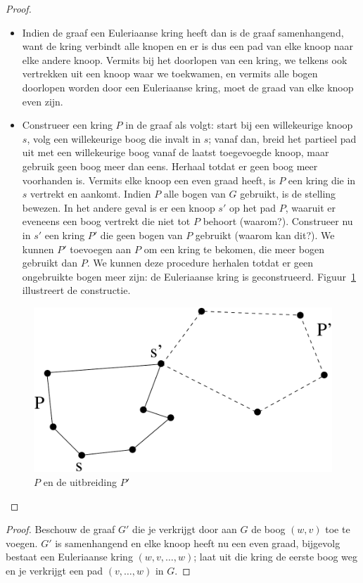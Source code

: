 \begin{proof}
\begin{itemize}
\item Indien de graaf een Euleriaanse kring heeft dan is de graaf
  samenhangend, want de kring verbindt alle knopen en er is dus een
  pad van elke knoop naar elke andere knoop. Vermits bij het doorlopen
  van een kring, we telkens ook vertrekken uit een knoop waar we
  toekwamen, en vermits alle bogen doorlopen worden door een
  Euleriaanse kring, moet de graad van elke knoop even zijn.
\item Construeer een kring $P$ in de graaf als volgt: start bij een
  willekeurige knoop $s$, volg een willekeurige boog die invalt in $s$; vanaf
  dan, breid het partieel pad uit met een willekeurige boog vanaf de
  laatst toegevoegde knoop, maar gebruik geen boog meer dan eens.
  Herhaal totdat er geen boog meer voorhanden is. Vermits elke knoop
  een even graad
  heeft, is $P$ een kring die in $s$ vertrekt en aankomt. 
  Indien $P$ alle bogen van $G$ gebruikt, is de stelling 
  bewezen. In het andere geval is er een knoop $s'$ op het pad $P$, waaruit 
  er eveneens een boog vertrekt die niet tot $P$ behoort (waarom?). 
  Construeer nu in $s'$ een kring $P'$ die geen bogen van $P$ gebruikt (waarom 
  kan dit?). We kunnen $P'$ toevoegen aan $P$ om een kring te bekomen, die
  meer bogen gebruikt dan $P$. We kunnen deze procedure herhalen totdat er 
  geen ongebruikte bogen meer zijn:  de Euleriaanse kring is geconstrueerd.
  Figuur~\ref{euler4} illustreert de
  constructie.
\end{itemize}
\begin{figure}[ht]
\begin{center}
\includegraphics[width=0.4\linewidth,keepaspectratio]{euler4}
\end{center}
\caption{ $P$ en de uitbreiding $P'$ \label{euler4}}
\end{figure}
\end{proof}


\begin{proof} Beschouw de graaf $G'$ die je verkrijgt door aan $G$ de
boog $(w,v)$ toe te voegen. $G'$ is samenhangend en elke knoop heeft nu
een even graad, bijgevolg bestaat een Euleriaanse kring $(w,v,\ldots,w)$;
laat uit die kring de eerste boog weg en je verkrijgt een pad
$(v,\ldots,w)$ in $G$.
\end{proof}

